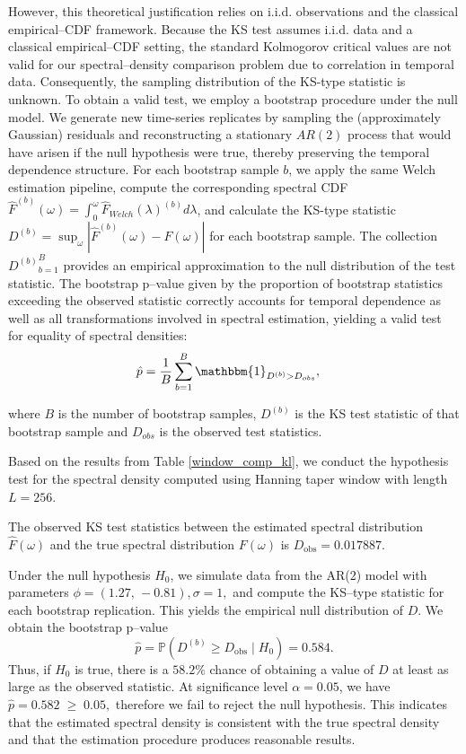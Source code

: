 \documentclass[preprint]{aastex}
\theoremstyle{nonitalicname}
\theoremstyle{plain}
\theoremstyle{remark}
\begin{document}
However, this theoretical justification relies on i.i.d. observations and the classical empirical--CDF framework. Because the KS test assumes i.i.d. data and a classical empirical--CDF setting, the standard Kolmogorov critical values are not valid for our spectral--density comparison problem due to correlation in temporal data. Consequently, the sampling distribution of the KS-type statistic is unknown.
To obtain a valid test, we employ a bootstrap procedure under the null model. We generate new time-series replicates by sampling the (approximately Gaussian) residuals and reconstructing a stationary $AR(2)$ process that would have arisen if the null hypothesis were true, thereby preserving the temporal dependence structure. For each bootstrap sample $b$, we apply the same Welch estimation pipeline, compute the corresponding spectral CDF $\widehat F^{(b)}(\omega) = \int_0^\omega \widehat F_{Welch}(\lambda)^{(b)}d\lambda$, and calculate the KS-type statistic $D^{(b)} = \sup_{\omega} |\widehat F^{(b)}(\omega)- F(\omega)|$ for each bootstrap sample. The collection ${D^{(b)}}_{b=1}^B$ provides an empirical approximation to the null distribution of the test statistic. The bootstrap p--value given by the proportion of bootstrap statistics exceeding the observed statistic correctly accounts for temporal dependence as well as all transformations involved in spectral estimation, yielding a valid test for equality of spectral densities:
\begin{equation}
    \hat p = \frac{1}{B}\sum_{b=1}^B \mathbbm{1}_{D^{(b)} > D_{obs}}, \quad 
\end{equation}

where $B$ is the number of bootstrap samples, $D^{(b)}$ is the KS test statistic of that bootstrap sample and $D_{obs}$ is the observed test statistics. 

Based on the results from Table \ref{window_comp_kl}, we conduct the hypothesis test for the spectral density computed using Hanning taper window with length $L=256$. 

The observed KS test statistics between the estimated spectral distribution $\widehat F(\omega)$ and the true spectral distribution $F(\omega)$ is $D_{\mathrm{obs}} = 0.017887.$

Under the null hypothesis $H_0$, we simulate data from the AR(2) model with parameters $\phi = (1.27,\,-0.81),\sigma = 1,$
and compute the KS--type statistic for each bootstrap replication.  This yields the empirical null distribution of $D$.
We obtain the bootstrap p--value 
\begin{equation}
    \hat p  =  \mathbb{P} (D^{(b)} \ge D_{\mathrm{obs}} \mid H_0) = 0.584.
\end{equation}
Thus, if $H_0$ is true, there is a $58.2\%$ chance of obtaining a value of $D$ at least as large as the observed statistic.
At significance level $\alpha = 0.05$, we have $\hat p = 0.582 \; \ge \; 0.05,$ therefore we fail to reject the null hypothesis.  
This indicates that the estimated spectral density is consistent with the true spectral density and that the estimation procedure produces reasonable results.
\end{document}
